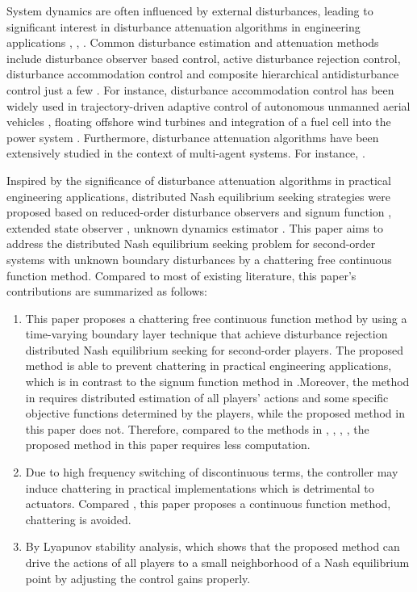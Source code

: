 \documentclass[lettersize,journal]{IEEEtran}
\begin{document}
System dynamics are often influenced by external disturbances, leading to significant interest in disturbance attenuation algorithms in engineering applications \cite{7265050}, \cite{xie2000much}, \cite{li2014disturbance}. Common disturbance estimation and attenuation methods include disturbance observer based control, active disturbance rejection control, disturbance accommodation control and composite hierarchical antidisturbance control just a few \cite{7265050}.
For instance, disturbance accommodation control has been widely used in trajectory-driven adaptive control of autonomous unmanned aerial vehicles \cite{prabhakar2018trajectory}, floating offshore wind turbines \cite{namik2009disturbance} and integration of a fuel cell into the power system \cite{paradkar2004integration}.
Furthermore, disturbance attenuation algorithms have been extensively studied in the context of multi-agent systems.
For instance, .





Inspired by the significance of disturbance attenuation algorithms in practical engineering applications, distributed Nash equilibrium seeking strategies were proposed based on reduced-order disturbance observers and signum function \cite{9696299}, extended state observer \cite{ye2020distributed}, unknown dynamics estimator \cite{li2021distributed}.
This paper aims to address the distributed Nash equilibrium seeking problem for second-order systems with unknown boundary disturbances by a chattering free continuous function method. Compared to most of existing literature, this paper's contributions are summarized as follows:
\begin{enumerate}
    \item This paper proposes a chattering free continuous function method by using a time-varying boundary layer technique that achieve disturbance rejection distributed Nash equilibrium seeking for second-order players. The proposed method is able to prevent chattering in practical engineering applications, which is in contrast to the signum function method in \cite{9696299}.Moreover, the method in \cite{8985536} requires distributed estimation of all players' actions and some specific objective functions determined by the players, while the proposed method in this paper does not. Therefore, compared to the methods in \cite{9696299}, \cite{ye2020distributed}, \cite{li2021distributed}, \cite{8985536}, the proposed method in this paper requires less computation.
    \item Due to high frequency switching of discontinuous terms, the controller may induce chattering in practical implementations which is detrimental to actuators. Compared \cite{9696299}, this paper proposes a continuous function method, chattering is avoided.
    \item By Lyapunov stability analysis, which shows that the proposed method can drive the actions of all players to a small neighborhood of a Nash equilibrium point by adjusting the control gains properly.
\end{enumerate}
\end{document}
